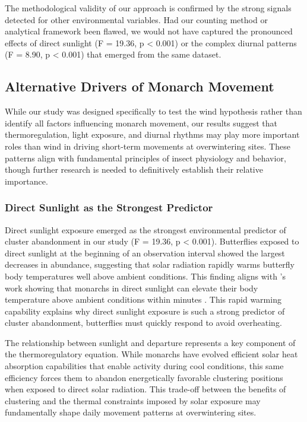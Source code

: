 The methodological validity of our approach is confirmed by the strong signals detected for other environmental variables. Had our counting method or analytical framework been flawed, we would not have captured the pronounced effects of direct sunlight (F = 19.36, p < 0.001) or the complex diurnal patterns (F = 8.90, p < 0.001) that emerged from the same dataset.

\subsection{Alternative Drivers of Monarch Movement}

While our study was designed specifically to test the wind hypothesis rather than identify all factors influencing monarch movement, our results suggest that thermoregulation, light exposure, and diurnal rhythms may play more important roles than wind in driving short-term movements at overwintering sites. These patterns align with fundamental principles of insect physiology and behavior, though further research is needed to definitively establish their relative importance.

\subsubsection{Direct Sunlight as the Strongest Predictor}

Direct sunlight exposure emerged as the strongest environmental predictor of cluster abandonment in our study (F = 19.36, p < 0.001). Butterflies exposed to direct sunlight at the beginning of an observation interval showed the largest decreases in abundance, suggesting that solar radiation rapidly warms butterfly body temperatures well above ambient conditions. This finding aligns with \citeauthor{masters_thermal_1988}'s work showing that monarchs in direct sunlight can elevate their body temperature above ambient conditions within minutes \autocite{masters_thermal_1988}. This rapid warming capability explains why direct sunlight exposure is such a strong predictor of cluster abandonment, butterflies must quickly respond to avoid overheating.

The relationship between sunlight and departure represents a key component of the thermoregulatory equation. While monarchs have evolved efficient solar heat absorption capabilities that enable activity during cool conditions, this same efficiency forces them to abandon energetically favorable clustering positions when exposed to direct solar radiation. This trade-off between the benefits of clustering and the thermal constraints imposed by solar exposure may fundamentally shape daily movement patterns at overwintering sites.

